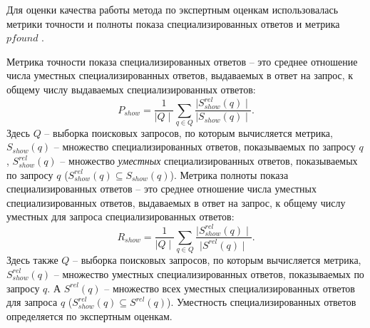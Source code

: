 \documentclass[12pt,a4paper]{report}
\newcommand*\card[1]{{\mid #1 \mid}}
\begin{document}
Для оценки качества работы метода по экспертным оценкам использовалась метрики точности и полноты показа специализированных ответов \cite{Metrics} и метрика $pfound$ \cite{PFound}. 

Метрика точности показа специализированных ответов -- это среднее отношение числа уместных специализированных ответов, выдаваемых в ответ на запрос, к общему числу выдаваемых специализированных ответов:
\begin{equation}
P_{show} = \frac{1}{\card{Q}} \sum \limits_{q \in Q} \frac{\card{S_{show}^{rel}(q)}}{\card{S_{show}(q)}}.
\end{equation}
Здесь $Q$ -- выборка поисковых запросов, по которым вычисляется метрика, $S_{show}(q)$ -- множество специализированных ответов, показываемых по запросу $q$, $S_{show}^{rel}(q)$ -- множество \emph{уместных} специализированных ответов, показываемых по запросу $q$ \linebreak ($S_{show}^{rel}(q) \subseteq S_{show}(q)$).
Метрика полноты показа специализированных ответов -- это среднее отношение числа уместных специализированных ответов, выдаваемых в ответ на запрос, к общему числу уместных для запроса специализированных ответов: 
\begin{equation}
R_{show} = \frac{1}{\card{Q}} \sum \limits_{q \in Q} \frac{\card{S_{show}^{rel}(q)}}{\card{S^{rel}(q)}}.
\end{equation}
Здесь также $Q$ -- выборка поисковых запросов, по которым вычисляется метрика, \linebreak $S_{show}^{rel}(q)$ -- множество уместных специализированных ответов, показываемых по запросу $q$. А $S^{rel}(q)$ -- множество всех уместных специализированных ответов для запроса $q$ ($S_{show}^{rel}(q) \subseteq S^{rel}(q)$). Уместность специализированных ответов определяется по экспертным оценкам.
\end{document}
